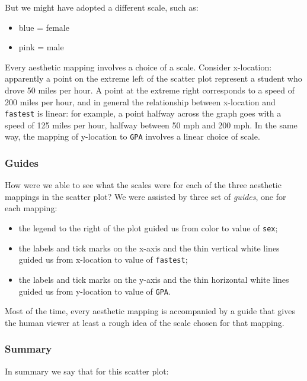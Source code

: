 \documentclass[]{book}
\providecommand{\tightlist}{%
  \setlength{\itemsep}{0pt}\setlength{\parskip}{0pt}}
\theoremstyle{definition}
\theoremstyle{definition}
\theoremstyle{definition}
\theoremstyle{remark}
\begin{document}
{But we might have adopted a different scale, such as:

\begin{itemize}
\tightlist
\item
  blue = female
\item
  pink = male
\end{itemize}

Every aesthetic mapping involves a choice of a scale. Consider
x-location: apparently a point on the extreme left of the scatter plot
represent a student who drove 50 miles per hour. A point at the extreme
right corresponds to a speed of 200 miles per hour, and in general the
relationship between x-location and \texttt{fastest} is linear: for
example, a point halfway across the graph goes with a speed of 125 miles
per hour, halfway between 50 mph and 200 mph. In the same way, the
mapping of y-location to \texttt{GPA} involves a linear choice of scale.

\subsubsection{\texorpdfstring{Guides
}{Guides }}\label{guides}

How were we able to see what the scales were for each of the three
aesthetic mappings in the scatter plot? We were assisted by three set of
\emph{guides}, one for each mapping:

\begin{itemize}
\tightlist
\item
  the legend to the right of the plot guided us from color to value of
  \texttt{sex};
\item
  the labels and tick marks on the x-axis and the thin vertical white
  lines guided us from x-location to value of \texttt{fastest};
\item
  the labels and tick marks on the y-axis and the thin horizontal white
  lines guided us from y-location to value of \texttt{GPA}.
\end{itemize}

Most of the time, every aesthetic mapping is accompanied by a guide that
gives the human viewer at least a rough idea of the scale chosen for
that mapping.

\subsubsection{Summary}\label{summary}

In summary we say that for this scatter plot:

}
\end{document}
